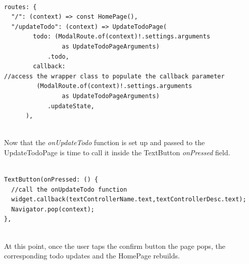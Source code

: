 \begin{code}

\mbox{}
\label{code:2.42}
\begin{verbatim}

routes: {
  "/": (context) => const HomePage(),
  "/updateTodo": (context) => UpdateTodoPage(
        todo: (ModalRoute.of(context)!.settings.arguments
                as UpdateTodoPageArguments)
            .todo,
        callback:
//access the wrapper class to populate the callback parameter        
         (ModalRoute.of(context)!.settings.arguments
                as UpdateTodoPageArguments)
            .updateState,
      ),
\end{verbatim}
\end{code}
\mbox{}\\
Now that the \textit{onUpdateTodo } function is set up and  passed to the UpdateTodoPage is  time to call it inside the TextButton \textit{onPressed  }field.
\mbox{}\\
\begin{code}

\mbox{}
\label{code:2.43}
\begin{verbatim}

TextButton(onPressed: () {
  //call the onUpdateTodo function
  widget.callback(textControllerName.text,textControllerDesc.text);
  Navigator.pop(context);
},
\end{verbatim}
\end{code}
\mbox{}\\
At this point, once the user taps the confirm button the page pops, the corresponding todo updates and the HomePage rebuilds.\\



